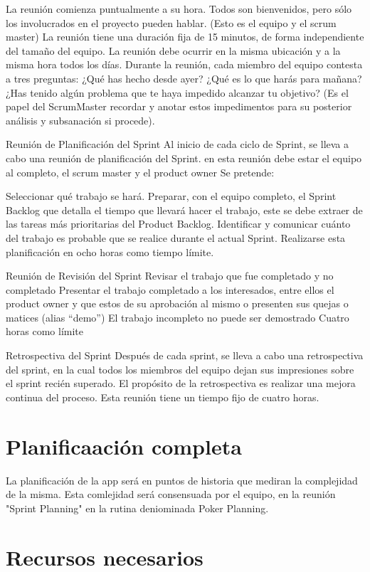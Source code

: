 \documentclass[../pfc.tex]{subfiles}
\begin{document}
	La reunión comienza puntualmente a su hora.
	Todos son bienvenidos, pero sólo los involucrados en el proyecto pueden hablar. (Esto es el equipo y el scrum master)
	La reunión tiene una duración fija de 15 minutos, de forma independiente del tamaño del equipo.
	La reunión debe ocurrir en la misma ubicación y a la misma hora todos los días.
	Durante la reunión, cada miembro del equipo contesta a tres preguntas:
	¿Qué has hecho desde ayer?
	¿Qué es lo que harás para mañana?
	¿Has tenido algún problema que te haya impedido alcanzar tu objetivo? (Es el papel del ScrumMaster recordar y anotar estos impedimentos para su posterior análisis y subsanación si procede).
	
	Reunión de Planificación del Sprint 
	Al inicio de cada ciclo de Sprint, se lleva a cabo una reunión de planificación del Sprint. en esta reunión debe estar el equipo al completo, el scrum master y el product owner Se pretende:
	
	Seleccionar qué trabajo se hará.
	Preparar, con el equipo completo, el Sprint Backlog que detalla el tiempo que llevará hacer el trabajo, este se debe extraer de las tareas más prioritarias del Product Backlog. 
	Identificar y comunicar cuánto del trabajo es probable que se realice durante el actual Sprint.
	Realizarse esta planificación en ocho horas como tiempo límite.
	
	Reunión de Revisión del Sprint
	Revisar el trabajo que fue completado y no completado
	Presentar el trabajo completado a los interesados, entre ellos el product owner y que estos de su aprobación al mismo o presenten sus quejas o matices (alias “demo”)
	El trabajo incompleto no puede ser demostrado
	Cuatro horas como límite
	
	Retrospectiva del Sprint 
	Después de cada sprint, se lleva a cabo una retrospectiva del sprint, en la cual todos los miembros del equipo dejan sus impresiones sobre el sprint recién superado. El propósito de la retrospectiva es realizar una mejora continua del proceso. Esta reunión tiene un tiempo fijo de cuatro horas.
	
	\section{Planificaación completa}
	
	La planificación de la app será en puntos de historia que mediran la complejidad de la misma. Esta comlejidad será consensuada por el equipo, en la reunión "Sprint Planning" en la rutina deniominada Poker Planning.  
	
	\section{Recursos necesarios}
	
\end{document}
